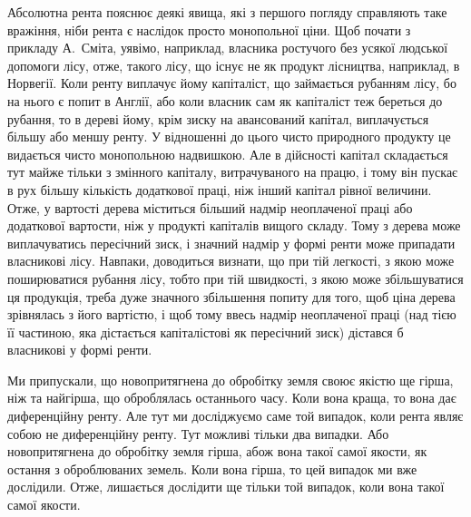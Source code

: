 Абсолютна рента пояснює деякі явища, які з першого погляду справляють
таке вражіння, ніби рента є наслідок просто монопольної ціни. Щоб почати
з прикладу А.~Сміта, уявімо, наприклад, власника ростучого без усякої
людської допомоги лісу, отже, такого лісу, що існує не як продукт лісництва,
наприклад, в Норвегії. Коли ренту виплачує йому капіталіст, що займається
рубанням лісу, бо на нього є попит в Англії, або коли власник сам як капіталіст
теж береться до рубання, то в дереві йому, крім зиску на авансований
капітал, виплачується більшу або меншу ренту. У відношенні до цього чисто
природного продукту це видається чисто монопольною надвишкою. Але в дійсності
капітал складається тут майже тільки з змінного капіталу, витрачуваного
на працю, і тому він пускає в рух більшу кількість додаткової праці, ніж інший
капітал рівної величини. Отже, у вартості дерева міститься більший надмір
неоплаченої праці або додаткової вартости, ніж у продукті капіталів вищого
складу. Тому з дерева може виплачуватись пересічний зиск, і значний надмір у
формі ренти може припадати власникові лісу. Навпаки, доводиться визнати, що
при тій легкості, з якою може поширюватися рубання лісу, тобто при тій
швидкості, з якою може збільшуватися ця продукція, треба дуже значного збільшення
попиту для того, щоб ціна дерева зрівнялась з його вартістю, і щоб тому
ввесь надмір неоплаченої праці (над тією її частиною, яка дістається капіталістові
як пересічний зиск) дістався б власникові у формі ренти.

Ми припускали, що новопритягнена до обробітку земля своює якістю ще
гірша, ніж та найгірша, що оброблялась останнього часу. Коли вона краща, то
вона дає диференційну ренту. Але тут ми досліджуємо саме той випадок, коли
рента являє собою не диференційну ренту. Тут можливі тільки два випадки.
Або новопритягнена до обробітку земля гірша, абож вона такої самої якости,
як остання з оброблюваних земель. Коли вона гірша, то цей випадок ми вже
дослідили. Отже, лишається дослідити ще тільки той випадок, коли вона такої
самої якости.
